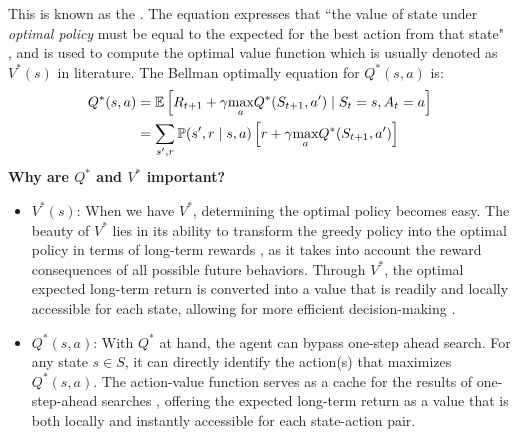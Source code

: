 This is known as the . The equation expresses that ``the value of  state under \textit{optimal policy} must be equal to the expected for the best action from that state" \cite{RL}, and
is used to compute the optimal value function which is usually denoted as $V^*(s)$ in literature.
The Bellman optimally equation for $Q^*(s,a)$ is:
\begin{align*}
    Q^{*}(s,a) &= \mathbb E \left [R_{t+1}
    + \gamma \underset{a}{\text{max}}Q^*(S_{t+1},a')  \mid S_{t} =s, A_t = a \right] \\
    &= \sum_{s',r}\mathbb P(s',r \mid s,a)
    \left [r + \gamma \underset{a}{\text{max}}Q^*(S_{t+1},a') 
    \right]
\end{align*}
\textbf{Why are $Q^*$ and $V^*$ important?}
\begin{itemize}
    \item $V^*(s)$: When we have $V^*$, determining the optimal policy becomes easy. The beauty of $V^*$ lies in its ability to transform the greedy policy into the optimal policy in terms of long-term rewards \cite{RL}, as it takes into account the reward consequences of all possible future behaviors. Through $V^*$, the optimal expected long-term return is converted into a value that is readily and locally accessible for each state, allowing for more efficient decision-making \cite{RL}.
     
    \item $Q^*(s,a)$: With $Q^*$ at hand, the agent can bypass one-step ahead search. For any state $s \in S$, it can directly identify the action(s) that maximizes $Q^*(s,a)$. The action-value function serves as a cache for the results of one-step-ahead searches \cite{RL}, offering the expected long-term return as a value that is both locally and instantly accessible for each state-action pair.
\end{itemize}

